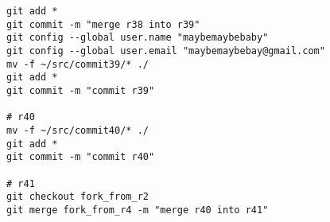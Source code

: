 
\tiny
\begin{verbatim}
git add *
git commit -m "merge r38 into r39"
git config --global user.name "maybemaybebaby"
git config --global user.email "maybemaybebay@gmail.com"
mv -f ~/src/commit39/* ./
git add *
git commit -m "commit r39"

# r40
mv -f ~/src/commit40/* ./
git add *
git commit -m "commit r40"

# r41
git checkout fork_from_r2
git merge fork_from_r4 -m "merge r40 into r41"

\end{verbatim}
\normalsize
\newpage

\thispagestyle{empty}
\BgThispage

